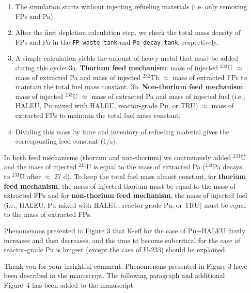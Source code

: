 \documentclass[answers,11pt]{exam}
\begin{document}
\begin{questions}
\begin{solution}
               \begin{enumerate}
               	\item The simulation starts without injecting refueling materials (i.e. only removing FPs and Pa).
               	\item After the first depletion calculation step, we check the total mass density of FPs and Pa in the \texttt{FP-waste tank} and \texttt{Pa-decay tank}, respectively.
               	\item A simple calculation yields the amount of heavy metal that must be added during this cycle:
               	\subitem 3a. \textbf{Thorium feed mechanism}: mass of injected 
               	$^{233}$U $\approx$ mass of extracted Pa and mass of injected 
               	$^{232}$Th $\approx$ mass of extracted FPs to maintain the 
               	total fuel mass constant.
               	\subitem 3b. \textbf{Non-thorium feed mechanism}: mass of injected $^{233}$U $\approx$ mass of extracted Pa and mass of injected fuel (i.e., HALEU, Pu mixed with HALEU, reactor-grade Pu, or TRU) $\approx$ mass of extracted FPs to maintain the total fuel mass constant.
               	\item Dividing this mass by time and inventory of refueling material gives the corresponding feed constant (1/s).
               \end{enumerate}
               In both feed mechanisms (thorium and non-thorium) we 
               continuously added $^{233}$U and the mass of injected $^{233}$U 
               is equal to the mass of extracted Pa ($^{233}$Pa decays to 
               $^{233}$U after $\approx$ 27 d). To keep the total fuel mass 
               almost constant, for \textbf{thorium feed mechanism}, the mass 
               of injected thorium must be equal to the mass of extracted FPs 
               and for \textbf{non-thorium feed mechanism}, the mass of 
               injected fuel (i.e., HALEU, Pu mixed with HALEU, reactor-grade 
               Pu, or TRU) must be equal to the mass of extracted FPs.
               
        \end{solution}


        \question Phenomenons presented in Figure 3 that K-eff for the case of Pu+HALEU firstly increases and then decreases, and the time to become subcritical for the case of reactor-grade Pu is longest (except the case of U-233) should be explained.
        \begin{solution}
                 Thank you for your insightful comment. Phenomenons presented 
                 in Figure 3 have been described in the manuscript.
                 The following paragraph and additional Figure~4 has been added to the manuscript:\\
                 

\end{solution}
\end{questions}
\end{document}
